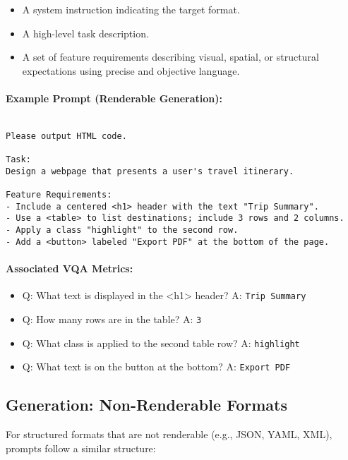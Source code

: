 \begin{itemize}
    \item A system instruction indicating the target format.
    \item A high-level task description.
    \item A set of feature requirements describing visual, spatial, or structural expectations using precise and objective language.
\end{itemize}

\paragraph{Example Prompt (Renderable Generation):}
\begin{lstlisting}[breaklines=true, basicstyle=\ttfamily\small]

Please output HTML code.

Task:
Design a webpage that presents a user's travel itinerary.

Feature Requirements:
- Include a centered <h1> header with the text "Trip Summary".
- Use a <table> to list destinations; include 3 rows and 2 columns.
- Apply a class "highlight" to the second row.
- Add a <button> labeled "Export PDF" at the bottom of the page.
\end{lstlisting}

\paragraph{Associated VQA Metrics:}
\begin{itemize}
    \item Q: What text is displayed in the <h1> header? \quad A: \texttt{Trip Summary}
    \item Q: How many rows are in the table? \quad A: \texttt{3}
    \item Q: What class is applied to the second table row? \quad A: \texttt{highlight}
    \item Q: What text is on the button at the bottom? \quad A: \texttt{Export PDF}
\end{itemize}

\subsection{Generation: Non-Renderable Formats}

For structured formats that are not renderable (e.g., JSON, YAML, XML), prompts follow a similar structure:

